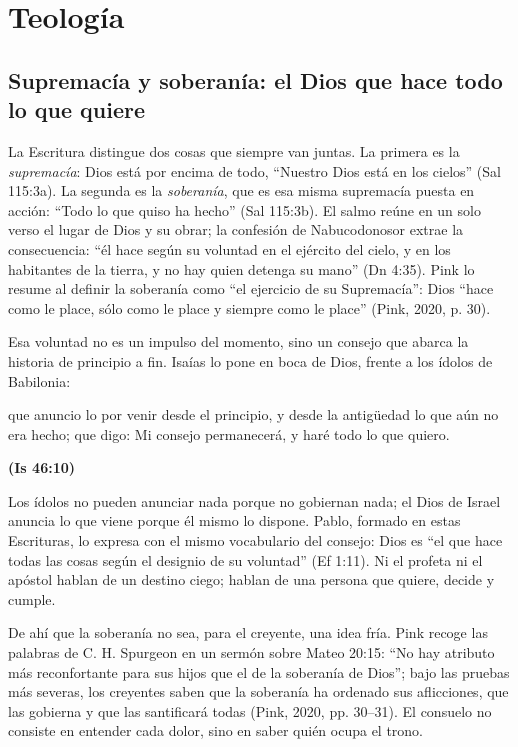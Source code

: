 \documentclass[11pt,letterpaper]{article}
\newcommand{\fuente}[1]{\par\hfill{\upshape\bfseries\small\textcolor{azul}{#1}}}
\begin{document}
\section{Teología}

\subsection{Supremacía y soberanía: el Dios que hace todo lo que quiere}
La Escritura distingue dos cosas que siempre van juntas. La primera es la \emph{supremacía}: Dios está por encima de todo, ``Nuestro Dios está en los cielos'' (Sal 115:3a). La segunda es la \emph{soberanía}, que es esa misma supremacía puesta en acción: ``Todo lo que quiso ha hecho'' (Sal 115:3b). El salmo reúne en un solo verso el lugar de Dios y su obrar; la confesión de Nabucodonosor extrae la consecuencia: ``él hace según su voluntad en el ejército del cielo, y en los habitantes de la tierra, y no hay quien detenga su mano'' (Dn 4:35). Pink lo resume al definir la soberanía como ``el ejercicio de su Supremacía'': Dios ``hace como le place, sólo como le place y siempre como le place'' (Pink, 2020, p. 30).

Esa voluntad no es un impulso del momento, sino un consejo que abarca la historia de principio a fin. Isaías lo pone en boca de Dios, frente a los ídolos de Babilonia:

\begin{cita}que anuncio lo por venir desde el principio, y desde la antigüedad lo que aún no era hecho; que digo: Mi consejo permanecerá, y haré todo lo que quiero.\fuente{(Is 46:10)}\end{cita}

Los ídolos no pueden anunciar nada porque no gobiernan nada; el Dios de Israel anuncia lo que viene porque él mismo lo dispone. Pablo, formado en estas Escrituras, lo expresa con el mismo vocabulario del consejo: Dios es ``el que hace todas las cosas según el designio de su voluntad'' (Ef 1:11). Ni el profeta ni el apóstol hablan de un destino ciego; hablan de una persona que quiere, decide y cumple.

De ahí que la soberanía no sea, para el creyente, una idea fría. Pink recoge las palabras de C. H. Spurgeon en un sermón sobre Mateo 20:15: ``No hay atributo más reconfortante para sus hijos que el de la soberanía de Dios''; bajo las pruebas más severas, los creyentes saben que la soberanía ha ordenado sus aflicciones, que las gobierna y que las santificará todas (Pink, 2020, pp. 30--31). El consuelo no consiste en entender cada dolor, sino en saber quién ocupa el trono.
\end{document}
